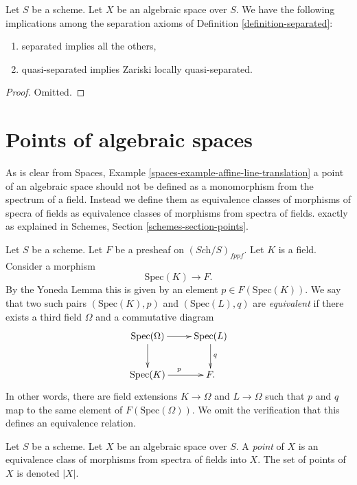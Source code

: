 \begin{lemma}
\label{lemma-trivial-implications}
Let $S$ be a scheme.
Let $X$ be an algebraic space over $S$.
We have the following implications among the separation axioms
of Definition \ref{definition-separated}:
\begin{enumerate}
\item separated implies all the others,
\item quasi-separated implies Zariski locally quasi-separated.
\end{enumerate}
\end{lemma}

\begin{proof}
Omitted.
\end{proof}











\section{Points of algebraic spaces}
\label{section-points}

\noindent
As is clear from
Spaces, Example \ref{spaces-example-affine-line-translation}
a point of an algebraic space should not be defined as a monomorphism
from the spectrum of a field.
Instead we define them as equivalence classes of morphisms of specra
of fields as equivalence classes of morphisms from spectra of fields.
exactly as explained in
Schemes, Section \ref{schemes-section-points}.

\medskip\noindent
Let $S$ be a scheme.
Let $F$ be a presheaf on $(\textit{Sch}/S)_{fppf}$.
Let $K$ is a field. Consider a morphism
$$
\text{Spec}(K) \longrightarrow F.
$$
By the Yoneda Lemma this is given by an
element $p \in F(\text{Spec}(K))$. We say that two such
pairs $(\text{Spec}(K), p)$ and $(\text{Spec}(L), q)$
are {\it equivalent} if there exists
a third field $\Omega$ and a commutative diagram
$$
\xymatrix{
\text{Spec}(\Omega) \ar[r] \ar[d] &
\text{Spec}(L) \ar[d]^q \\
\text{Spec}(K) \ar[r]^p &
F.
}
$$
In other words, there are field extensions
$K \to \Omega$ and $L \to \Omega$ such that
$p$ and $q$ map to the same element
of $F(\text{Spec}(\Omega))$. We omit the verification that this
defines an equivalence relation.

\begin{definition}
\label{definition-points}
Let $S$ be a scheme. Let $X$ be an algebraic space over $S$.
A {\it point} of $X$ is an equivalence class of morphisms
from spectra of fields into $X$.
The set of points of $X$ is denoted $|X|$.
\end{definition}


